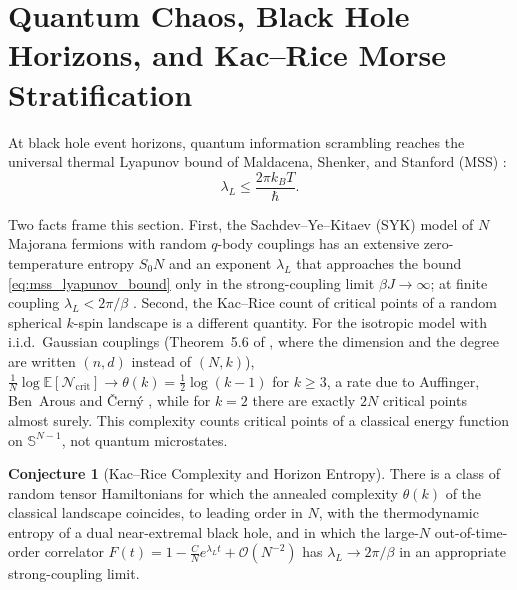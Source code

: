 \documentclass[11pt,a4paper,reqno]{amsart}
\theoremstyle{definition}
\newtheorem{conjecture}[theorem]{Conjecture}
\numberwithin{equation}{section}
\providecommand{\Sph}{\mathbb{S}}
\providecommand{\Sph}{\mathbb{S}}
\begin{document}
\section{Quantum Chaos, Black Hole Horizons, and Kac--Rice Morse Stratification}
\label{sec:chaos_kac_rice}

At black hole event horizons, quantum information scrambling reaches the universal thermal Lyapunov bound of Maldacena, Shenker, and Stanford (MSS) \cite{maldacena2016bound}:
\begin{equation}
    \label{eq:mss_lyapunov_bound}
    \lambda_L \le \frac{2\pi k_B T}{\hbar}.
\end{equation}

Two facts frame this section. First, the Sachdev--Ye--Kitaev (SYK) model of $N$ Majorana fermions with random $q$-body couplings has an extensive zero-temperature entropy $S_0 N$ and an exponent $\lambda_L$ that approaches the bound \eqref{eq:mss_lyapunov_bound} only in the strong-coupling limit $\beta J \to \infty$; at finite coupling $\lambda_L < 2\pi/\beta$ \cite{maldacena2016remarks}. Second, the Kac--Rice count of critical points of a random spherical $k$-spin landscape is a different quantity. For the isotropic model with i.i.d.\ Gaussian couplings (Theorem~5.6 of \cite{silvafilho2026functional}, where the dimension and the degree are written $(n, d)$ instead of $(N, k)$), $\frac1N \log \mathbb{E}[\mathcal{N}_{\mathrm{crit}}] \to \theta(k) = \frac12\log(k-1)$ for $k \ge 3$, a rate due to Auffinger, Ben~Arous and \v{C}ern\'y \cite{auffinger2013random}, while for $k = 2$ there are exactly $2N$ critical points almost surely. This complexity counts critical points of a classical energy function on $\Sph^{N-1}$, not quantum microstates.

\begin{conjecture}[Kac--Rice Complexity and Horizon Entropy]
\label{thm:horizon_morse_saturation}
There is a class of random tensor Hamiltonians for which the annealed complexity $\theta(k)$ of the classical landscape coincides, to leading order in $N$, with the thermodynamic entropy of a dual near-extremal black hole, and in which the large-$N$ out-of-time-order correlator $F(t) = 1 - \frac{C}{N} e^{\lambda_L t} + \mathcal{O}(N^{-2})$ has $\lambda_L \to 2\pi/\beta$ in an appropriate strong-coupling limit.
\end{conjecture}
\end{document}
